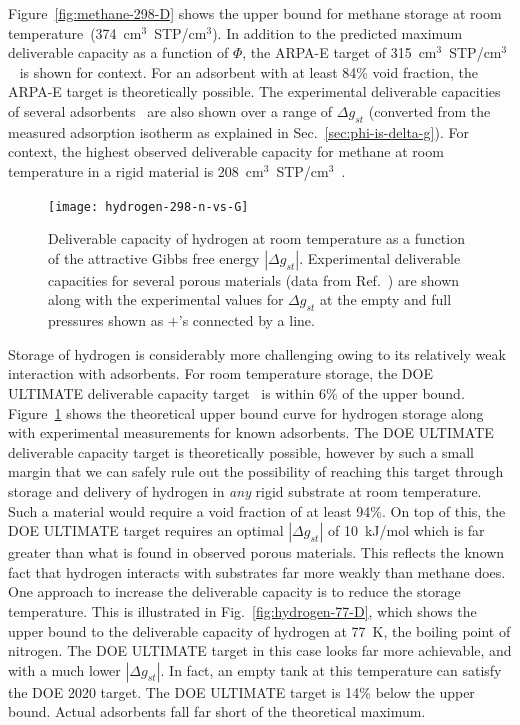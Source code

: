 \documentclass[twoside,twocolumn,9pt]{article}
\newcommand\V{\Phi}
\newcommand\gst{\ensuremath{\Delta g_{st}}}
\begin{document}
Figure~\ref{fig:methane-298-D} shows the upper bound for methane storage at
room temperature~(374~cm$^3$~STP/cm$^3$). In addition to the predicted maximum
deliverable capacity as a function of $\V$, the ARPA-E target of
315~cm$^3$~STP/cm$^3$~\cite{arpaemove} is shown for context. For an adsorbent
with at least 84\% void fraction, the ARPA-E target is theoretically possible.
The experimental deliverable capacities of several
adsorbents~\cite{mason2014evaluating} are also shown over a range of $\gst$
(converted from the measured adsorption isotherm as explained in
Sec.~\ref{sec:phi-is-delta-g}). For context, the highest observed
deliverable capacity for methane at room temperature in a rigid material is 208~cm$^3$~STP/cm$^3$~\cite{simon2015materials}.

\begin{figure}
    \centering
    \texttt{[image: hydrogen-298-n-vs-G]}
    \caption{Deliverable capacity of hydrogen at room temperature as a function of the attractive Gibbs free energy $|\gst|$.  Experimental deliverable capacities for several porous materials (data from Ref.~\cite{mason2014evaluating, garcia2018benchmark}) are shown along with the experimental values for $\gst$ at the empty and full pressures shown as $+$'s connected by a line.}
    \label{fig:hydrogen-298-D}
\end{figure}

Storage of hydrogen is considerably more challenging owing to its relatively
weak interaction with adsorbents. For room temperature storage, the DOE
ULTIMATE deliverable capacity target~\cite{DOE} is within 6\% of the upper
bound. Figure~\ref{fig:hydrogen-298-D} shows the theoretical upper bound curve
for hydrogen storage along with experimental measurements for known adsorbents. The
DOE ULTIMATE deliverable capacity target is theoretically possible, however by
such a small margin that we can safely rule out the possibility of reaching
this target through storage and delivery of hydrogen in \emph{any} rigid
substrate at room temperature. Such a material would require a void fraction of
at least 94\%. On top of this, the DOE ULTIMATE target requires an optimal
$|\gst|$ of 10~kJ/mol which is far greater than what is found in observed
porous materials. This reflects the known fact that hydrogen interacts with
substrates far more weakly than methane does. 
One approach to increase the deliverable capacity is to reduce the storage
temperature. This is illustrated in Fig.~\ref{fig:hydrogen-77-D}, which shows
the upper bound to the deliverable capacity of hydrogen at 77\ K, the boiling
point of nitrogen. The DOE ULTIMATE target in this case looks far more
achievable, and with a much lower $|\gst|$. In fact, an empty tank at this
temperature can satisfy the DOE 2020 target. The DOE ULTIMATE target is 14\%
below the upper bound. Actual adsorbents fall far short of the theoretical maximum.
\end{document}
